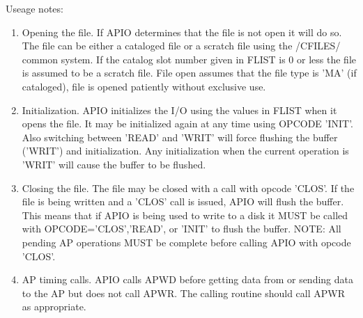 Useage notes:
\begin{enumerate} %
\item Opening the file.  If APIO determines that the file is not open
it will do so.  The file can be either a cataloged file or a
scratch file using the /CFILES/ common system.  If the
catalog slot number given in FLIST is 0 or less the file is
assumed to be a scratch file.  File open assumes that the file
type is 'MA' (if cataloged), file is opened patiently without
exclusive use.
\item Initialization.  APIO initializes the I/O using the values in
FLIST when it opens the file.  It may be initialized again at
any time using OPCODE 'INIT'.  Also switching between 'READ'
and 'WRIT' will force flushing the buffer ('WRIT') and
initialization.  Any initialization when the current operation
is 'WRIT' will cause the buffer to be flushed.
\item Closing the file.  The file may be closed with a call with
opcode 'CLOS'.  If the file is being written and a 'CLOS' call
is issued, APIO will flush the buffer.  This means that if APIO
is being used to write to a disk it MUST be called with
OPCODE='CLOS','READ', or 'INIT' to flush the buffer.
NOTE: All pending AP operations MUST be complete before calling
APIO with opcode 'CLOS'.
\item AP timing calls.  APIO calls APWD before getting data from or
sending data to the AP but does not call APWR.  The calling
routine should call APWR as appropriate.
\end{enumerate} %
